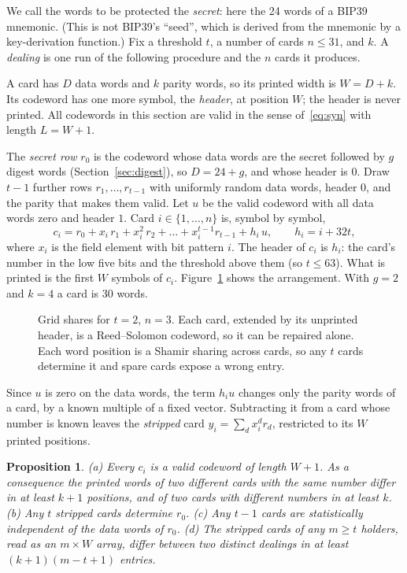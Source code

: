 \documentclass[numeric]{anvil-paper}
\newtheorem{proposition}{Proposition}
\begin{document}
We call the words to be protected the \emph{secret}: here the 24 words of a
BIP39 mnemonic. (This is not BIP39's ``seed'', which is derived from the
mnemonic by a key-derivation function.) Fix a threshold $t$, a number of cards
$n\le 31$, and $k$. A \emph{dealing} is one run of the following procedure and
the $n$ cards it produces.

A card has $D$ data words and $k$ parity words, so its printed width is
$W=D+k$. Its codeword has one more symbol, the \emph{header}, at position $W$;
the header is never printed. All codewords in this section are valid in the
sense of~\eqref{eq:syn} with length $L=W+1$.

The \emph{secret row} $r_0$ is the codeword whose data words are the secret
followed by $g$ digest words (Section~\ref{sec:digest}), so $D=24+g$, and whose
header is $0$. Draw $t-1$ further rows $r_1,\dots,r_{t-1}$ with uniformly random
data words, header $0$, and the parity that makes them valid. Let $u$ be the
valid codeword with all data words zero and header $1$. Card $i\in\{1,\dots,n\}$
is, symbol by symbol,
\begin{equation}
c_i = r_0 + x_i\,r_1 + x_i^2\,r_2+\dots+x_i^{t-1}r_{t-1} + h_i\,u,
\qquad h_i = i+32t ,
\label{eq:card}
\end{equation}
where $x_i$ is the field element with bit pattern $i$. The header of $c_i$ is
$h_i$: the card's number in the low five bits and the threshold above them
(so $t\le 63$). What is printed is the first $W$ symbols of $c_i$.
Figure~\ref{fig:grid} shows the arrangement. With $g=2$ and $k=4$ a card is 30
words.

\begin{figure}[!htb]
\centering

\caption{Grid shares for $t=2$, $n=3$. Each card, extended by its unprinted
header, is a Reed--Solomon codeword, so it can be repaired alone. Each word
position is a Shamir sharing across cards, so any $t$ cards determine it and
spare cards expose a wrong entry.}
\label{fig:grid}
\end{figure}

Since $u$ is zero on the data words, the term $h_i u$ changes only the parity
words of a card, by a known multiple of a fixed vector. Subtracting it from a
card whose number is known leaves the \emph{stripped} card
$y_i=\sum_d x_i^d r_d$, restricted to its $W$ printed positions.

\begin{proposition}
\label{prop:grid}
(a) Every $c_i$ is a valid codeword of length $W+1$. As a consequence the
printed words of two different cards with the same number differ in at least
$k+1$ positions, and of two cards with different numbers in at least $k$.
(b) Any $t$ stripped cards determine $r_0$.
(c) Any $t-1$ cards are statistically independent of the data words of $r_0$.
(d) The stripped cards of any $m\ge t$ holders, read as an $m\times W$ array,
differ between two distinct dealings in at least $(k+1)(m-t+1)$ entries.
\end{proposition}
\end{document}
